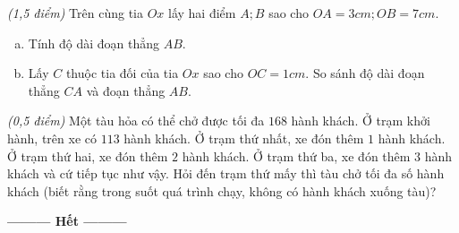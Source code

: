 \begin{ex}
\begin{enumerate}[a)]
\end{enumerate}
\end{ex}     \begin{ex}\textit{(1,5 điểm)} Trên cùng tia $Ox$ lấy hai điểm $A; B$ sao cho $OA = 3cm; OB = 7cm$.
\begin{enumerate}[a)]
\item Tính độ dài đoạn thẳng $AB$.
\item Lấy $C$ thuộc tia đối của tia $Ox$ sao cho $OC = 1cm$. So sánh độ dài đoạn thẳng $CA$ và đoạn thẳng $AB$.
\end{enumerate}
\end{ex}     \begin{ex}\textit{(0,5 điểm)} 
Một tàu hỏa có thể chở được tối đa $168$ hành khách. Ở trạm khởi hành, trên xe có $113$ hành khách. Ở trạm thứ nhất, xe đón thêm $1$ hành khách. Ở trạm thứ hai, xe đón thêm $2$ hành khách. Ở trạm thứ ba, xe đón thêm $3$ hành khách và cứ tiếp tục như vậy. Hỏi đến trạm thứ mấy thì tàu chở tối đa số hành khách (biết rằng trong suốt quá trình chạy, không có hành khách xuống tàu)?
\end{ex}
\begin{center}
\textbf{\textbf{---------} Hết \textbf{---------}}
\end{center}